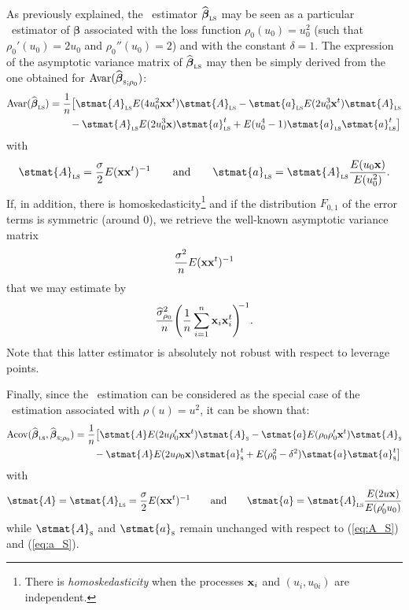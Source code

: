 \begin{stremark}
As previously explained, the ~estimator
$\sthat{\boldsymbol\beta}_\stsc{LS}$ may be seen as a particular 
~estimator of $\boldsymbol{\beta}$ associated with the loss function
$\rho_0(u_0) = u_0^2$ (such that $\rho_0'(u_0) = 2 u_0$ and $\rho_0''(u_0) =
2$) and with the constant $\delta = 1$. The expression of the asymptotic
variance matrix of $\widehat{\boldsymbol\beta}_\stsc{LS}$ may then be simply
derived from the one obtained for
$\mathrm{Avar}(\sthat{\boldsymbol\beta}_{\stsc{S};\rho_0})$:
%
\begin{align}
    \label{eq:Avar_betahat_LS}
    \mathrm{Avar}(\sthat{\boldsymbol\beta}_\stsc{LS})
    & = \frac{1}{n} \big[ \stmat{A}_\stsc{LS} E(4 u_0^2\stvec{x}\stvec{x}^t) \stmat{A}_\stsc{LS}
        -\stmat{a}_\stsc{LS} E(2 u_0^3 \stvec{x}^t) \stmat{A}_\stsc{LS}
    \\\nonumber & \qquad 
        - \stmat{A}_\stsc{LS} E(2 u_0^3 \stvec{x}) \stmat{a}_\stsc{LS}^t
        + E(u_0^4 - 1) \stmat{a}_\stsc{LS}\stmat{a}_\stsc{LS}^t \big]
\end{align}
%
with
%
\begin{equation}\label{eq:A_a_LS}
    \stmat{A}_\stsc{LS} = \frac{\sigma}{2} E(\stvec{x}\stvec{x}^t)^{-1}
    \qquad\text{and}\qquad
    \stmat{a}_\stsc{LS} = \stmat{A}_\stsc{LS} \frac{E(u_0\stvec{x})}{E(u_0^2)}.
\end{equation}
%
If, in addition, there is homoskedasticity\footnote{There is
\emph{homoskedasticity} when the processes $\mathbf x_i$ and $(u_i, u_{0i})$
are independent.} and if the distribution $F_{0,1}$ of the error terms is
symmetric (around 0), we retrieve the well-known asymptotic variance matrix
\[
    \frac{\sigma^2}{n} E(\mathbf x\mathbf x^t)^{-1}
\]
that we may estimate by
\[
    \frac{\sthat{\sigma}_{\rho_0}^2}{n} 
    \left(\frac{1}{n} \sum_{i=1}^{n} \stvec{x}_i\stvec{x}_i^t\right)^{\!\!-1}.
\]
Note that this latter estimator is absolutely not robust with respect to
leverage points.

Finally, since the ~estimation can be considered as the special case of the
~estimation associated with $\rho(u) = u^2$, it can be shown that:
%
\begin{equation}
    \label{eq:Acov_betahat_LS_S}
    \begin{split}
    \mathrm{Acov}(\sthat{\boldsymbol\beta}_\stsc{LS},\widehat{\boldsymbol\beta}_{\stsc{S};\rho_0})
    & = \frac{1}{n} \big[ \stmat{A} E(2 u \rho_0'\stvec{x}\stvec{x}^t) \stmat{A}_\stsc{S}
        - \stmat{a} E(\rho_0\rho_0'\stvec{x}^t) \stmat{A}_\stsc{S}
    \\
    & \qquad 
        - \stmat{A} E(2 u \rho_0\stvec{x}) \stmat{a}_\stsc{S}^t
        + E(\rho_0^2 - \delta^2) \stmat{a}\stmat{a}_\stsc{S}^t \big]
    \end{split}
\end{equation}
%
with%
\[
    \stmat{A} = \stmat{A}_\stsc{LS} = \frac{\sigma}{2} E(\stvec{x}\stvec{x}^t)^{-1}
    \qquad\text{and}\qquad
    \stmat{a} = \stmat{A}_\stsc{LS} \frac{E(2 u \stvec{x})}{E(\rho_0'u_0)}
\]
while $\stmat{A}_\stsc{S}$ and $\stmat{a}_\stsc{S}$ remain unchanged with
respect to (\ref{eq:A_S}) and (\ref{eq:a_S}).
\end{stremark}

